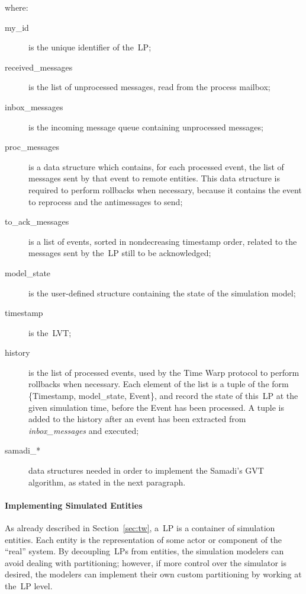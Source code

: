 \documentclass{sigplanconf}
\begin{document}
\noindent where:
\begin{description}
\item[my\_id] is the unique identifier of the~\ac{LP};
\item[received\_messages] is the list of unprocessed messages, read from the
process mailbox;
\item[inbox\_messages] is the incoming message queue containing
  unprocessed messages;
\item[proc\_messages] is a data structure which contains, for each
  processed event, the list of messages sent by that event to remote
  entities. This data structure is required to perform rollbacks when
  necessary, because it contains the event to reprocess and the
  antimessages to send;
\item[to\_ack\_messages] is a list of events, sorted in nondecreasing
  timestamp order, related to the messages sent by the~\ac{LP} still
  to be acknowledged;
\item[model\_state] is the user-defined structure containing the state
  of the simulation model;
\item[timestamp] is the~\ac{LVT};
\item[history] is the list of processed events, used by the Time Warp
  protocol to perform rollbacks when necessary. Each element of the
  list is a tuple of the form \{Timestamp, model\_state, Event\}, and
  record the state of this~\ac{LP} at the given simulation time, before
  the Event has been processed. A tuple is added to the history after an event has been
  extracted from \emph{inbox\_messages} and executed;
\item[samadi\_*] data structures needed in order to implement the Samadi's GVT algorithm, as stated in
the next paragraph.
\end{description}

\paragraph*{Implementing Simulated Entities}
As already described in Section~\ref{sec:tw}, a~\ac{LP} is a container
of simulation entities. Each entity is the representation of some
actor or component of the ``real'' system. By decoupling~\acp{LP} from
entities, the simulation modelers can avoid dealing with partitioning;
however, if more control over the simulator is desired, the modelers
can implement their own custom partitioning by working at the~\ac{LP}
level.
\end{document}
